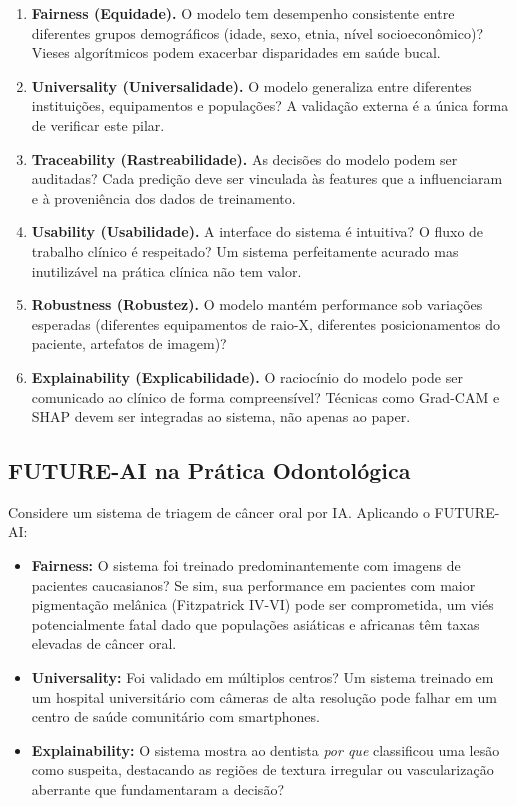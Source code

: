 \begin{enumerate}
    \item \textbf{Fairness (Equidade).} O modelo tem desempenho consistente entre diferentes grupos demográficos (idade, sexo, etnia, nível socioeconômico)? Vieses algorítmicos podem exacerbar disparidades em saúde bucal.
    \item \textbf{Universality (Universalidade).} O modelo generaliza entre diferentes instituições, equipamentos e populações? A validação externa é a única forma de verificar este pilar.
    \item \textbf{Traceability (Rastreabilidade).} As decisões do modelo podem ser auditadas? Cada predição deve ser vinculada às features que a influenciaram e à proveniência dos dados de treinamento.
    \item \textbf{Usability (Usabilidade).} A interface do sistema é intuitiva? O fluxo de trabalho clínico é respeitado? Um sistema perfeitamente acurado mas inutilizável na prática clínica não tem valor.
    \item \textbf{Robustness (Robustez).} O modelo mantém performance sob variações esperadas (diferentes equipamentos de raio-X, diferentes posicionamentos do paciente, artefatos de imagem)?
    \item \textbf{Explainability (Explicabilidade).} O raciocínio do modelo pode ser comunicado ao clínico de forma compreensível? Técnicas como Grad-CAM e SHAP devem ser integradas ao sistema, não apenas ao paper.
\end{enumerate}

\subsection{FUTURE-AI na Prática Odontológica}

Considere um sistema de triagem de câncer oral por IA. Aplicando o FUTURE-AI:

\begin{itemize}
    \item \textbf{Fairness:} O sistema foi treinado predominantemente com imagens de pacientes caucasianos? Se sim, sua performance em pacientes com maior pigmentação melânica (Fitzpatrick IV-VI) pode ser comprometida, um viés potencialmente fatal dado que populações asiáticas e africanas têm taxas elevadas de câncer oral.
    \item \textbf{Universality:} Foi validado em múltiplos centros? Um sistema treinado em um hospital universitário com câmeras de alta resolução pode falhar em um centro de saúde comunitário com smartphones.
    \item \textbf{Explainability:} O sistema mostra ao dentista \textit{por que} classificou uma lesão como suspeita, destacando as regiões de textura irregular ou vascularização aberrante que fundamentaram a decisão?
\end{itemize}

